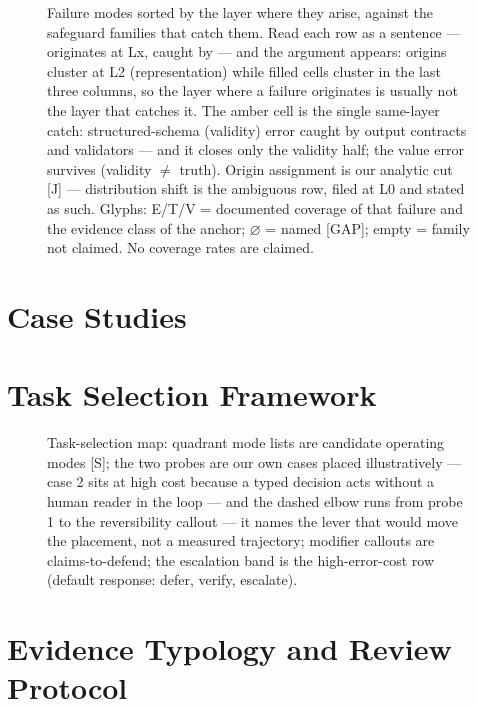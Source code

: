 \documentclass[11pt]{article}
\begin{document}
\begin{figure}[t]
  \centering
  \resizebox{\linewidth}{!}{}
  \caption{ Failure modes sorted by the layer where they arise, against the safeguard families that catch them. Read each row as a sentence --- originates at Lx, caught by --- and the argument appears: origins cluster at L2 (representation) while filled cells cluster in the last three columns, so the layer where a failure originates is usually not the layer that catches it. The amber cell is the single same-layer catch: structured-schema (validity) error caught by output contracts and validators --- and it closes only the validity half; the value error survives (validity $\ne$ truth). Origin assignment is our analytic cut [J] --- distribution shift is the ambiguous row, filed at L0 and stated as such. Glyphs: E/T/V = documented coverage of that failure and the evidence class of the anchor; $\varnothing$ = named [GAP]; empty = family not claimed. No coverage rates are claimed.}
  \label{fig:failmatrix}
\end{figure}

\section{Case Studies}\label{sec:cases}

\FloatBarrier

\section{Task Selection Framework}\label{sec:selection}
\begin{figure}[t]
  \centering
  
  \caption{ Task-selection map: quadrant mode lists are candidate operating modes [S]; the two probes are our own cases placed illustratively --- case 2 sits at high cost because a typed decision acts without a human reader in the loop --- and the dashed elbow runs from probe 1 to the reversibility callout --- it names the lever that would move the placement, not a measured trajectory; modifier callouts are claims-to-defend; the escalation band is the high-error-cost row (default response: defer, verify, escalate).}
  \label{fig:map}
\end{figure}

\FloatBarrier

\section{Evidence Typology and Review Protocol}\label{sec:protocol}

\FloatBarrier
\end{document}
